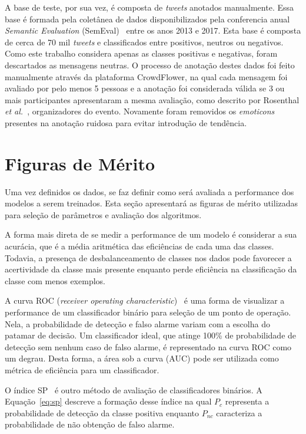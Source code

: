 A base de teste, por sua vez, é composta de \textit{tweets} anotados manualmente.
Essa base é formada pela coletânea de dados disponibilizados pela conferencia anual \textit{Semantic Evaluation}
(SemEval)~\cite{semeval17} entre os anos 2013 e 2017.
Esta base é composta de cerca de 70 mil \textit{tweets} e classificados entre positivos, neutros ou negativos.
Como este trabalho considera apenas as classes positivas e negativas, foram descartados as mensagens neutras.
O processo de anotação destes dados foi feito manualmente através da plataforma CrowdFlower, na qual cada mensagem
foi avaliado por pelo menos 5 pessoas e a anotação foi considerada válida se 3 ou mais participantes apresentaram a
mesma avaliação, como descrito por Rosenthal \textit{et al.}~\cite{rosenthal17}, organizadores do evento.
Novamente foram removidos os \textit{emoticons} presentes na anotação ruidosa para evitar introdução de tendência.

\section{Figuras de Mérito} \label{sec:metrics}

Uma vez definidos os dados, se faz definir como será avaliada a performance dos modelos a serem treinados.
Esta seção apresentará as figuras de mérito utilizadas para seleção de parâmetros e avaliação dos algoritmos.

A forma mais direta de se medir a performance de um modelo é considerar a sua acurácia, que é a média aritmética das
eficiências de cada uma das classes.
Todavia, a presença de desbalanceamento de classes nos dados pode favorecer a acertividade da classe mais presente
enquanto perde eficiência na classificação da classe com menos exemplos.

A curva ROC (\textit{receiver operating characteristic})~\cite{bradley97} é uma forma de visualizar a performance de um
classificador binário para seleção de um ponto de operação.
Nela, a probabilidade de detecção e falso alarme variam com a escolha do patamar de decisão.
Um classificador ideal, que atinge 100\% de probabilidade de detecção sem nenhum caso de falso alarme, é representado na
curva ROC como um degrau.
Desta forma, a área sob a curva (AUC) pode ser utilizada como métrica de eficiência para um classificador.

O índice SP~\cite{ciodaro12} é outro método de avaliação de classificadores binários.
A Equação~\ref{eq:sp} descreve a formação desse índice na qual $P_c$ representa a probabilidade de detecção da classe
positiva enquanto $P_{nc}$ caracteriza a probabilidade de não obtenção de falso alarme.

